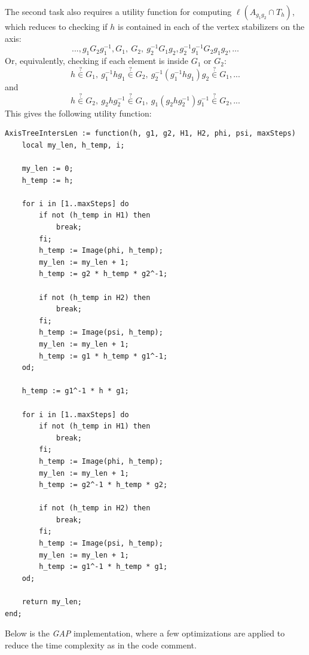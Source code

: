 \documentclass[12pt,leqno]{amsart}
\newcommand{\2}{L^2_{\rm per}(0, T)}
\numberwithin{equation}{section}
\numberwithin{figure}{section}
\begin{document}
The second task also requires a utility function for computing $\ell(A_{g_1g_2}\cap T_h)$, which reduces to checking if $h$ is contained in each of the vertex stabilizers on the axis:
\[
...,g_1G_2g_1^{-1}, G_1,\ G_2,\ g_2^{-1}G_1g_2, g_2^{-1}g_1^{-1}G_2g_1g_2,\dots
\]
Or, equivalently, checking if each element is inside $G_1$ or $G_2$:
\[
h\overset{?}{\in} G_1,\ g_1^{-1}hg_1\overset{?}{\in} G_2,\ g_2^{-1}(g_1^{-1}hg_1)g_2\overset{?}{\in} G_1,...
\]
and
\[
h\overset{?}{\in} G_2,\ g_2hg_2^{-1}\overset{?}{\in} G_1,\ g_1(g_2hg_2^{-1})g_1^{-1}\overset{?}{\in} G_2,...
\]
This gives the following utility function:
\begin{verbatim}
AxisTreeIntersLen := function(h, g1, g2, H1, H2, phi, psi, maxSteps)
    local my_len, h_temp, i;

    my_len := 0;
    h_temp := h;

    for i in [1..maxSteps] do
        if not (h_temp in H1) then
            break;
        fi;
        h_temp := Image(phi, h_temp);
        my_len := my_len + 1;
        h_temp := g2 * h_temp * g2^-1;

        if not (h_temp in H2) then
            break;
        fi;
        h_temp := Image(psi, h_temp);
        my_len := my_len + 1;
        h_temp := g1 * h_temp * g1^-1;
    od;

    h_temp := g1^-1 * h * g1;

    for i in [1..maxSteps] do
        if not (h_temp in H1) then
            break;
        fi;
        h_temp := Image(phi, h_temp);
        my_len := my_len + 1;
        h_temp := g2^-1 * h_temp * g2;

        if not (h_temp in H2) then
            break;
        fi;
        h_temp := Image(psi, h_temp);
        my_len := my_len + 1;
        h_temp := g1^-1 * h_temp * g1;
    od;

    return my_len;
end;
\end{verbatim}
Below is the \textit{GAP} implementation, where a few optimizations are applied to reduce the time complexity as in the code comment.
\end{document}
